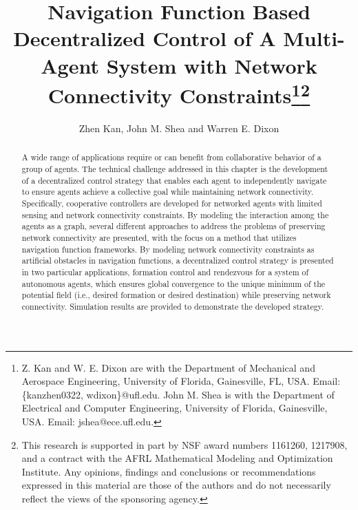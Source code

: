\documentclass[english]{IOS-Book-Article}
\theoremstyle{definition}
\theoremstyle{definition}
\begin{document}
\begin{frontmatter}


\title{Navigation Function Based Decentralized Control of A Multi-Agent
System with Network Connectivity Constraints\thanks{Z. Kan and W. E. Dixon are with the Department of Mechanical and Aerospace
Engineering, University of Florida, Gainesville, FL, USA. Email: \{kanzhen0322,
wdixon\}@ufl.edu. John M. Shea is with the Department of Electrical
and Computer Engineering, University of Florida, Gainesville, USA.
Email: jshea@ece.ufl.edu. }\thanks{This research is supported in part by NSF award numbers 1161260, 1217908,
and a contract with the AFRL Mathematical Modeling and Optimization
Institute. Any opinions, findings and conclusions or recommendations
expressed in this material are those of the authors and do not necessarily
reflect the views of the sponsoring agency.}}

\maketitle
\begin{center}


\author{Zhen Kan, John M. Shea and Warren E. Dixon}

\end{center}
\begin{abstract}
A wide range of applications require or can benefit from collaborative
behavior of a group of agents. The technical challenge addressed in
this chapter is the development of a decentralized control strategy
that enables each agent to independently navigate to ensure agents
achieve a collective goal while maintaining network connectivity.
Specifically, cooperative controllers are developed for networked
agents with limited sensing and network connectivity constraints.
By modeling the interaction among the agents as a graph, several different
approaches to address the problems of preserving network connectivity
are presented, with the focus on a method that utilizes navigation
function frameworks. By modeling network connectivity constraints
as artificial obstacles in navigation functions, a decentralized control
strategy is presented in two particular applications, formation control
and rendezvous for a system of autonomous agents, which ensures global
convergence to the unique minimum of the potential field (i.e., desired
formation or desired destination) while preserving network connectivity.
Simulation results are provided to demonstrate the developed strategy.
\end{abstract}
\end{frontmatter}
\end{document}
